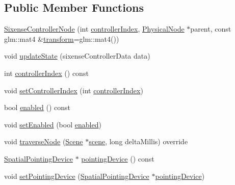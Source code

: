 \subsection*{Public Member Functions}
\begin{DoxyCompactItemize}
\item 
\hyperlink{classmotorcar_1_1SixenseControllerNode_acb326fa6a4174d767eedc5563cf8f3bb}{Sixense\-Controller\-Node} (int \hyperlink{classmotorcar_1_1SixenseControllerNode_aa061782ed3ae2a57180fdad9dc6383d9}{controller\-Index}, \hyperlink{classmotorcar_1_1PhysicalNode}{Physical\-Node} $\ast$parent, const glm\-::mat4 \&\hyperlink{classmotorcar_1_1SceneGraphNode_ad96e79fdd739ac8223a3128003be391a}{transform}=glm\-::mat4())
\item 
void \hyperlink{classmotorcar_1_1SixenseControllerNode_afbe76474cf77da7e11b0ac1b291b51f3}{update\-State} (sixense\-Controller\-Data data)
\item 
int \hyperlink{classmotorcar_1_1SixenseControllerNode_aa061782ed3ae2a57180fdad9dc6383d9}{controller\-Index} () const 
\item 
void \hyperlink{classmotorcar_1_1SixenseControllerNode_a337d87a6667b7e35301978c8017f2b20}{set\-Controller\-Index} (int \hyperlink{classmotorcar_1_1SixenseControllerNode_aa061782ed3ae2a57180fdad9dc6383d9}{controller\-Index})
\item 
bool \hyperlink{classmotorcar_1_1SixenseControllerNode_a46ff3af0aa1723d13a7f2a2be599a786}{enabled} () const 
\item 
void \hyperlink{classmotorcar_1_1SixenseControllerNode_aae977f21555500a932f2d9e7a670acd9}{set\-Enabled} (bool \hyperlink{classmotorcar_1_1SixenseControllerNode_a46ff3af0aa1723d13a7f2a2be599a786}{enabled})
\item 
void \hyperlink{classmotorcar_1_1SixenseControllerNode_ab525f98319a51aff7043b79dc137e26f}{traverse\-Node} (\hyperlink{classmotorcar_1_1Scene}{Scene} $\ast$\hyperlink{classmotorcar_1_1SceneGraphNode_aa14e637ed4ae98f77e28941a4b5cfdd8}{scene}, long delta\-Millis) override
\item 
\hyperlink{classmotorcar_1_1SpatialPointingDevice}{Spatial\-Pointing\-Device} $\ast$ \hyperlink{classmotorcar_1_1SixenseControllerNode_ad46bc47d07a912d24d27640f6cea28e4}{pointing\-Device} () const 
\item 
void \hyperlink{classmotorcar_1_1SixenseControllerNode_adab8248c0f5e4adb4a55afca1b096338}{set\-Pointing\-Device} (\hyperlink{classmotorcar_1_1SpatialPointingDevice}{Spatial\-Pointing\-Device} $\ast$\hyperlink{classmotorcar_1_1SixenseControllerNode_ad46bc47d07a912d24d27640f6cea28e4}{pointing\-Device})
\end{DoxyCompactItemize}
